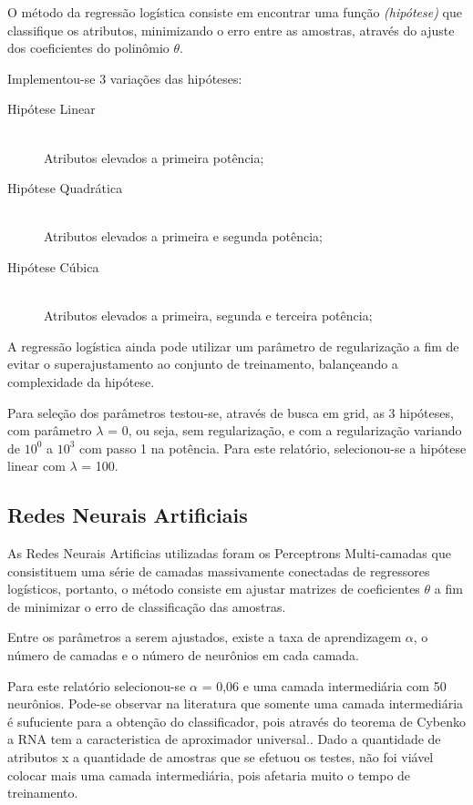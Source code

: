 O método da regressão logística consiste em encontrar uma função \emph{(hipótese)} que classifique os atributos, minimizando o erro entre as amostras, através do ajuste dos coeficientes do polinômio \(\theta\).

Implementou-se 3 variações das hipóteses:

\begin{description}
\item[Hipótese Linear] \hfill \\ Atributos elevados a primeira potência;
\item[Hipótese Quadrática] \hfill \\ Atributos elevados a primeira e segunda potência;
\item[Hipótese Cúbica] \hfill \\ Atributos elevados a primeira, segunda e terceira potência;
\end{description}

A regressão logística ainda pode utilizar um parâmetro de regularização a fim de evitar o superajustamento ao conjunto de treinamento, balançeando a complexidade da hipótese.

Para seleção dos parâmetros testou-se, através de busca em grid, as 3 hipóteses, com parâmetro \(\lambda\) = 0, ou seja, sem regularização, e com a regularização variando de \(10^0\) a \(10^3\) com passo 1 na potência. Para este relatório, selecionou-se a hipótese linear com \(\lambda\) = 100.

\subsection{Redes Neurais Artificiais}

As Redes Neurais Artificias utilizadas foram os Perceptrons Multi-camadas que consistituem uma série de camadas massivamente conectadas de regressores logísticos, portanto, o método consiste em ajustar matrizes de coeficientes \(\theta\) a fim de minimizar o erro de classificação das amostras.

Entre os parâmetros a serem ajustados, existe a taxa de aprendizagem \(\alpha\), o número de camadas e o número de neurônios em cada camada.

Para este relatório selecionou-se \(\alpha\) = 0,06 e uma camada intermediária com 50 neurônios. Pode-se observar na literatura que somente uma camada intermediária é sufuciente para a obtenção do classificador, pois através do teorema de Cybenko a RNA tem a caracteristica de aproximador universal.\cite{cybenko}. Dado a quantidade de atributos x a quantidade de amostras que se efetuou os testes, não foi viável colocar mais uma camada intermediária, pois afetaria muito o tempo de treinamento.

